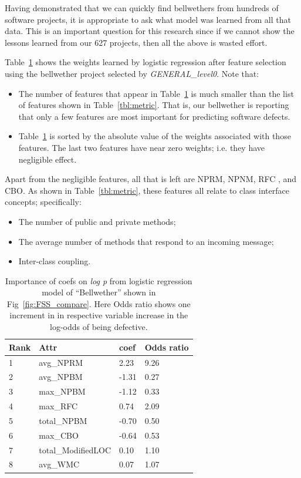 \documentclass[10pt,journal,compsoc]{IEEEtran}
\newcommand{\bi}{\begin{itemize}}
\newcommand{\ei}{\end{itemize}}
\begin{document}
Having demonstrated that we can quickly find bellwethers
from hundreds of software projects, it is appropriate to ask
what model was learned from all that data. This is an important question for this research since if  we cannot show the lessons
learned from our 627 projects, then all the above is wasted effort.

Table~\ref{tbl:coefs}  shows the weights learned by logistic
regression after feature selection using the bellwether project
selected by {\em GENERAL\_level0}. Note that:
\bi
\item
The number of features that appear in Table~\ref{tbl:coefs}  is much smaller than the list of features shown in Table~\ref{tbl:metric}.
That is, our bellwether is reporting that only a few features
are most important for predicting software defects.
\item
Table~\ref{tbl:coefs}  is sorted by the absolute value of the weights
associated with those features. The last two features have near
zero weights; i.e. they have negligible effect.
\ei
Apart from the negligible features, all that is left are NPRM, NPNM, RFC , and CBO. As shown in Table~\ref{tbl:metric}, these features
all relate to class interface concepts; specifically: 
\bi
\item
The number of public and private methods; 
\item
The  average number of methods that respond to an incoming message; 
\item
Inter-class coupling. 
\ei
\begin{table}[!t]
\centering
\begin{tabular}{|l|l|l|l|} \hline
Rank & Attr               & coef  & Odds ratio \\ \hline
1    & avg\_NPRM          & 2.23  & 9.26      \\ \hline
2    & avg\_NPBM          & -1.31 & 0.27      \\ \hline
3    & max\_NPBM          & -1.12 & 0.33      \\ \hline
4    & max\_RFC           & 0.74  & 2.09      \\ \hline 
5    & total\_NPBM        & -0.70 & 0.50      \\ \hline
6    & max\_CBO           & -0.64 & 0.53      \\ \hline
7    & total\_ModifiedLOC & 0.10  & 1.10      \\ \hline
8    & avg\_WMC           & 0.07  & 1.07     \\ \hline
\end{tabular}

\caption{Importance of coefs on \textit{log p} from logistic regression model of ``Bellwether'' shown in Fig~\ref{fig:FSS_compare}. Here Odds ratio shows one increment in in respective variable increase in the log-odds of being defective.}\label{tbl:coefs}
\end{table}
\end{document}
